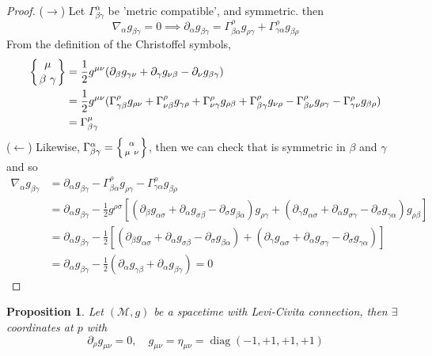 \documentclass[a4paper]{article}
\DeclareMathOperator{\diag}{diag}
\theoremstyle{new}
\newtheorem{prop}{Proposition}[section]
\begin{document}
\begin{proof}
($\rightarrow$) Let $\Gamma_{\beta\gamma}^\alpha$ be 'metric compatible', and symmetric. then
$$\nabla_\alpha g_{\beta\gamma}=0\implies\partial_\alpha g_{\beta\gamma}=\Gamma_{\beta\alpha}^\rho g_{\rho\gamma}+\Gamma_{\gamma\alpha}^\rho g_{\beta\rho}$$
From the definition of the Christoffel symbols,
\begin{align}
\left \{ {\mu \atop
\beta\ \gamma}\right \}&=\frac{1}{2}g^{\mu\nu}(\partial_\beta g_{\gamma\nu}+\partial_\gamma g_{\nu\beta}-\partial_\nu g_{\beta\gamma})\nonumber\\&=\frac{1}{2}g^{\mu\nu}(\Gamma^\rho_{\gamma\beta}g_{\rho\nu}+\Gamma_{\nu\beta}^\rho g_{\gamma\rho}+\Gamma_{\nu\gamma}^\rho g_{\rho\beta}+\Gamma_{\beta\gamma}^\rho g_{\nu\rho}-\Gamma_{\beta\nu}^\rho g_{\rho\gamma}-\Gamma_{\gamma\nu}^\rho g_{\beta\rho})\nonumber\\&=\Gamma_{\beta\gamma}^\mu
\end{align}
($\leftarrow$) Likewise, $\Gamma_{\beta\gamma}^\alpha=\left \{ {\alpha \atop
\mu\ \nu}\right \}$, then we can check that is symmetric in $\beta$ and $\gamma$ and so 
\begin{align}
    \nabla_\alpha g_{\beta\gamma}&=\partial_\alpha g_{\beta\gamma}-\Gamma_{\beta\alpha}^\rho g_{\rho\gamma}-\Gamma_{\gamma\alpha}^\rho g_{\beta\rho}\nonumber\\&=\partial_\alpha g_{\beta\gamma}-\frac{1}{2}g^{\rho\sigma}[(\partial_\beta g_{\alpha\sigma}+\partial_\alpha g_{\sigma\beta}-\partial_\sigma g_{\beta\alpha})g_{\rho\gamma}+(\partial_\gamma g_{\alpha\sigma}+\partial_\alpha g_{\sigma\gamma}-\partial_\sigma g_{\gamma\alpha})g_{\rho\beta}]\nonumber\\&=\partial_\alpha g_{\beta\gamma}-\frac{1}{2}[(\partial_\beta g_{\alpha\sigma}+\partial_\alpha g_{\sigma\beta}-\partial_\sigma g_{\beta\alpha})+(\partial_\gamma g_{\alpha\sigma}+\partial_\alpha g_{\sigma\gamma}-\partial_\sigma g_{\gamma\alpha})]\nonumber\\&=\partial_\alpha g_{\beta\gamma}-\frac{1}{2}(\partial_\alpha g_{\gamma\beta}+\partial_\alpha g_{\beta\gamma})=0\nonumber
\end{align}
\end{proof}
\begin{prop}
Let $(\mathcal{M},g)$ be a spacetime with Levi-Civita connection, then $\exists$ coordinates at $p$ with 
$$\partial_\rho g_{\mu\nu}=0,\quad g_{\mu\nu}=\eta_{\mu\nu}=\diag(-1,+1,+1,+1)$$
\end{prop}
\end{document}
